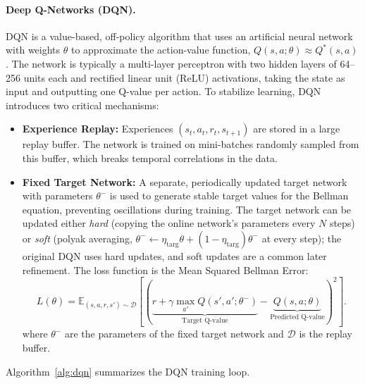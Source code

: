 \paragraph{Deep Q-Networks (DQN).}
DQN is a value-based, off-policy algorithm that uses an artificial neural network with weights $\theta$ to approximate the action-value function, $Q(s, a; \theta) \approx Q^*(s, a)$ \cite{Mnih2015}. The network is typically a multi-layer perceptron with two hidden layers of 64--256 units each and rectified linear unit (ReLU) activations, taking the state as input and outputting one Q-value per action. To stabilize learning, DQN introduces two critical mechanisms:
\begin{itemize}
    \item \textbf{Experience Replay:} Experiences $(s_t, a_t, r_t, s_{t+1})$ are stored in a large replay buffer. The network is trained on mini-batches randomly sampled from this buffer, which breaks temporal correlations in the data.
    \item \textbf{Fixed Target Network:} A separate, periodically updated target network with parameters $\theta^-$ is used to generate stable target values for the Bellman equation, preventing oscillations during training. The target network can be updated either \emph{hard} (copying the online network's parameters every $N$ steps) or \emph{soft} (polyak averaging, $\theta^- \leftarrow \eta_{\mathrm{targ}}\theta + (1-\eta_{\mathrm{targ}})\theta^-$ at every step); the original DQN uses hard updates, and soft updates are a common later refinement. The loss function is the Mean Squared Bellman Error:
    \begin{equation}\label{eq:dqn_loss}
    L(\theta) = \mathbb{E}_{(s,a,r,s') \sim \mathcal{D}} \left[ \left( \underbrace{r + \gamma \max_{a'} Q(s', a'; \theta^-)}_{\text{Target Q-value}} - \underbrace{Q(s, a; \theta)}_{\text{Predicted Q-value}} \right)^2 \right].
    \end{equation}
    where $\theta^-$ are the parameters of the fixed target network and $\mathcal{D}$ is the replay buffer.
\end{itemize}
Algorithm~\ref{alg:dqn} summarizes the DQN training loop.

